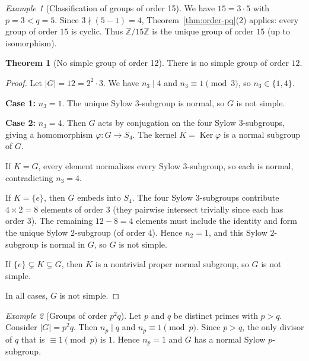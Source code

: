 \documentclass[12pt,a4paper,openany]{book}
\theoremstyle{definition}
\newtheorem{theorem}{Theorem}[chapter]
\theoremstyle{remark}
\newtheorem{example}{Example}[chapter]
\newcommand{\Z}{\mathbb{Z}}
\DeclareMathOperator{\Ker}{Ker}
\begin{document}
\begin{example}[Classification of groups of order 15]\label{ex:order-15}
We have $15=3\cdot 5$ with $p=3<q=5$.  Since
$3\nmid(5-1)=4$, Theorem~\ref{thm:order-pq}(2) applies: every group
of order $15$ is cyclic.  Thus $\Z/15\Z$ is the unique group of
order $15$ (up to isomorphism).
\end{example}

\begin{theorem}[No simple group of order 12]\label{thm:no-simple-12}
There is no simple group of order $12$.
\end{theorem}

\begin{proof}
Let $|G|=12=2^2\cdot 3$.  We have $n_3\mid 4$ and
$n_3\equiv 1\pmod{3}$, so $n_3\in\{1,4\}$.

\textbf{Case 1:} $n_3=1$.  The unique Sylow $3$-subgroup is normal,
so $G$ is not simple.

\textbf{Case 2:} $n_3=4$.  Then $G$ acts by conjugation on the four
Sylow $3$-subgroups, giving a homomorphism $\varphi\colon G\to S_4$.
The kernel $K=\Ker\varphi$ is a normal subgroup of $G$.

If $K=G$, every element normalizes every Sylow $3$-subgroup, so each
is normal, contradicting $n_3=4$.

If $K=\{e\}$, then $G$ embeds into $S_4$.  The four Sylow
$3$-subgroups contribute $4\times 2=8$ elements of order $3$
(they pairwise intersect trivially since each has order $3$).
The remaining $12-8=4$ elements must include the identity and form
the unique Sylow $2$-subgroup (of order $4$).  Hence $n_2=1$, and
this Sylow $2$-subgroup is normal in $G$, so $G$ is not simple.

If $\{e\}\subsetneq K\subsetneq G$, then $K$ is a nontrivial proper
normal subgroup, so $G$ is not simple.

In all cases, $G$ is not simple.
\end{proof}

\begin{example}[Groups of order $p^2 q$]\label{ex:order-p2q}
Let $p$ and $q$ be distinct primes with $p>q$.  Consider $|G|=p^2 q$.
Then $n_p\mid q$ and $n_p\equiv 1\pmod{p}$.  Since $p>q$, the only
divisor of $q$ that is $\equiv 1\pmod{p}$ is $1$.  Hence $n_p=1$
and $G$ has a normal Sylow $p$-subgroup.
\end{example}

\end{document}
